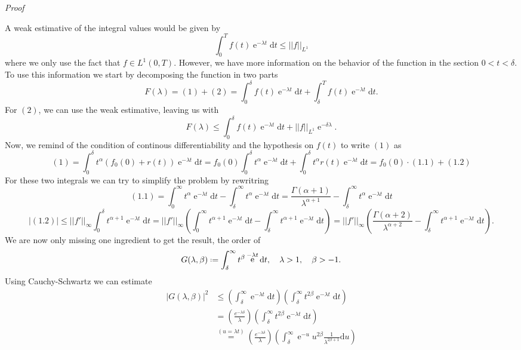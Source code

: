 \documentclass[]{report}
\makeatletter
\DeclareMathOperator{\ee}{e}
\newcommand*{\deff}{\mathrel{\vcenter{\baselineskip0.5ex \lineskiplimit0pt
			\hbox{\scriptsize.}\hbox{\scriptsize.}}}%
	=}
\newcommand{\dd}{\mathrm{d}}
\numberwithin{equation}{section} %
\newenvironment{Mproof}[1][Proof]{\par
	\pushQED{\qed}%
	\normalfont \topsep6\p@\@plus6\p@\relax
	\trivlist
	\item\relax
	{\itshape
		#1\@addpunct{.}}\hspace\labelsep\ignorespaces
}{%
	\popQED\endtrivlist\@endpefalse
}
\makeatother
\begin{document}
\begin{Mproof}
	A weak estimative of the integral values would be given by
	$$\int_{0}^{T} f(t) \ee^{-\lambda t} \dd t \leq ||f||_{L^1}$$
	where we only use the fact that $f \in L^1(0,T)$. However, we have more information on the behavior of the function in the section $0 < t < \delta$. To use this information we start by decomposing the function in two parts
	$$F(\lambda) = (1) + (2) = \int_{0}^{\delta} f(t) \ee^{-\lambda t} \dd t + \int_{\delta}^{T} f(t) \ee^{-\lambda t} \dd t.$$
	For $(2)$, we can use the weak estimative, leaving us with 
	$$F(\lambda) \leq \int_{0}^{\delta} f(t) \ee^{-\lambda t} \dd t + ||f||_{L^1} \ee^{-\delta \lambda}.$$
	Now, we remind of the condition of continous differentiability and the hypothesis on $f(t)$ to write $(1)$ as
	$$(1) = \int_{0}^{\delta} t^\alpha(f_0(0) + r(t)) \ee^{-\lambda t} \dd t = f_0(0) \int_{0}^{\delta} t^\alpha \ee^{-\lambda t} \dd t + \int_{0}^{\delta} t^\alpha r(t) \ee^{-\lambda t} \dd t = f_0(0) \cdot (1.1) + (1.2)$$
	For these two integrals we can try to simplify the problem by rewritring 
	$$(1.1) = \int_{0}^{\infty} t^\alpha \ee^{-\lambda t} \dd t - \int_{\delta}^{\infty} t^\alpha \ee^{-\lambda t} \dd t  = \frac{\Gamma(\alpha + 1)}{\lambda^{\alpha +1}} - \int_{\delta}^{\infty} t^\alpha \ee^{-\lambda t} \dd t $$
	$$|(1.2)| \leq ||f'||_{\infty} \int_{0}^{\delta} t^{\alpha + 1} \ee^{-\lambda t} \dd t = ||f'||_{\infty} \left( \int_{0}^{\infty} t^{\alpha+1} \ee^{-\lambda t} \dd t - \int_{\delta}^{\infty} t^{\alpha+1} \ee^{-\lambda t} \dd t \right) = ||f'||_{\infty} \left( \frac{\Gamma(\alpha + 2)}{\lambda^{\alpha +2}} - \int_{\delta}^{\infty} t^{\alpha+1} \ee^{-\lambda t} \dd t \right).$$
	We are now only missing one ingredient to get the result, the order of
	$$G(\lambda, \beta) \deff \int_{\delta}^{\infty} t^{\beta} \ee^{-\lambda t} \dd t, \ \ \ \lambda > 1, \ \ \ \beta > -1. $$
	Using Cauchy-Schwartz we can estimate
	\begin{equation*}
		\begin{split}
		|G(\lambda, \beta)|^2 & \leq \left( \int_{\delta}^{\infty} \ee^{-\lambda t} \dd t \right) \left(\int_{\delta}^{\infty} t^{2\beta} \ee^{-\lambda t} \dd t \right) \\
		& = \left(\frac{e^{-\lambda \delta}}{\lambda}\right) \left( \int_{\delta}^{\infty} t^{2\beta} \ee^{-\lambda t}\dd t \right)	\\
		& \stackrel{(u=\lambda t)}{=} \left(\frac{e^{-\lambda \delta}}{\lambda}\right) \left( \int_{\delta}^{\infty} \ee^{-u} u^{2\beta} \frac{1}{\lambda^{2\beta + 1}} \dd u \right) \\

\end{split}
\end{equation*}
\end{Mproof}
\end{document}
